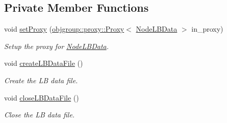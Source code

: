 \subsection*{Private Member Functions}
\begin{DoxyCompactItemize}
\item 
void \hyperlink{structvt_1_1vrt_1_1collection_1_1balance_1_1_node_l_b_data_aaa93321a91e51b7785bedb1e97786bfa}{set\+Proxy} (\hyperlink{structvt_1_1objgroup_1_1proxy_1_1_proxy}{objgroup\+::proxy\+::\+Proxy}$<$ \hyperlink{structvt_1_1vrt_1_1collection_1_1balance_1_1_node_l_b_data}{Node\+L\+B\+Data} $>$ in\+\_\+proxy)
\begin{DoxyCompactList}\small\item\em Setup the proxy for {\ttfamily \hyperlink{structvt_1_1vrt_1_1collection_1_1balance_1_1_node_l_b_data}{Node\+L\+B\+Data}}. \end{DoxyCompactList}\item 
void \hyperlink{structvt_1_1vrt_1_1collection_1_1balance_1_1_node_l_b_data_a90da580e29fec7ae6dad22b071fd5db3}{create\+L\+B\+Data\+File} ()
\begin{DoxyCompactList}\small\item\em Create the LB data file. \end{DoxyCompactList}\item 
void \hyperlink{structvt_1_1vrt_1_1collection_1_1balance_1_1_node_l_b_data_ae966be24ee1338594860af5de92d3e12}{close\+L\+B\+Data\+File} ()
\begin{DoxyCompactList}\small\item\em Close the LB data file. \end{DoxyCompactList}\end{DoxyCompactItemize}

